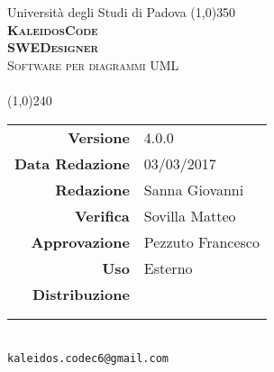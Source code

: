 \documentclass[a4paper,12pt]{article}
\author{KaleidosCode}
\date{03/03/2017}	%
\begin{document}
	\begin{titlepage}
		\centering Università degli Studi di Padova
		\line(1,0){350}\\
		\vspace{0.4cm}
		{\bfseries\scshape\LARGE KaleidosCode\\}
		\vspace{0.4cm}
		{\bfseries\scshape\LARGE SWEDesigner\\}
		{\scshape\Large Software per diagrammi UML\\}
		\vspace{1cm}
		{\scshape\Large \pianodiprogettoi\ \\}		%
		\vspace{1.4cm}
		\logo
		\vspace{1.2cm}
		\line(1,0){240}\\
		\begin{tabular}{r|l}
			{\hfill \textbf{Versione}} 			& 4.0.0\\
			{\hfill \textbf{Data Redazione}} 	& 03/03/2017\\	%
			{\hfill \textbf{Redazione}} 		& Sanna Giovanni \\
			{\hfill \textbf{Verifica}} 			& Sovilla Matteo\\
			{\hfill \textbf{Approvazione}} 		& Pezzuto Francesco\\
			{\hfill \textbf{Uso}} 				& Esterno\\
			{\hfill \textbf{Distribuzione}} 	& \vardanega \\ & \cardin \\ & \proponente\\
		\end{tabular}\\
		\vspace{2cm}
		\texttt{kaleidos.codec6@gmail.com}
	\end{titlepage}

	\pagestyle{myfront}
	\newpage
		
	\newpage
		\tableofcontents
	\newpage
		\listoffigures
	\newpage
		\listoftables
	\newpage
	\pagestyle{mymain}
		
	\newpage
		
	\newpage
		
	\newpage
		
	\newpage
		
	\newpage
		
	\label{LastPage}
\end{document}
